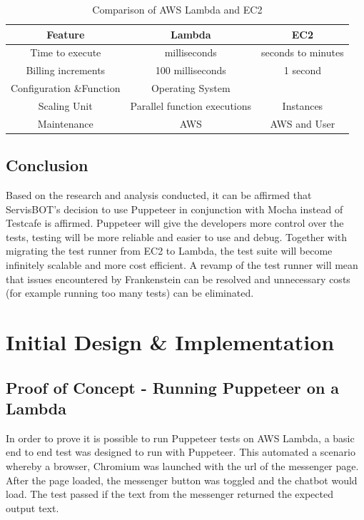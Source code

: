 \documentclass[12pt,a4paper,titlepage]{report}
\begin{document}
\begin{table}[ht]
  \centering
  \small
  \setlength\tabcolsep{6pt}
  \begin{tabular}{|c|c|c|}
   \hline
   \textbf{Feature} & \textbf{Lambda} & \textbf{EC2}\\
   \hline\hline
   Time to execute&milliseconds&seconds to minutes\\
   \hline
   Billing increments& 100 milliseconds&1 second\\
   \hline
   Configuration \&Function& Operating System\\
   \hline
   Scaling Unit&Parallel function executions&Instances\\
   \hline
   Maintenance& AWS&AWS and User\\
   \hline
  \end{tabular}
  \caption{Comparison of AWS Lambda and EC2 \autocite{inbook}}
 \end{table}

\section{Conclusion}
Based on the research and analysis conducted, it can be affirmed that ServisBOT's decision to use Puppeteer in conjunction 
with Mocha instead of Testcafe is affirmed. Puppeteer will give the developers more control over the tests, testing will be more reliable 
and easier to use and debug. Together with migrating the test runner from EC2 to Lambda, the test suite will become infinitely scalable and 
more cost efficient. A revamp of the test runner will mean that issues encountered by Frankenstein can be resolved and unnecessary costs (for 
example running too many tests) can be eliminated.

\chapter{Initial Design \& Implementation}

\section{Proof of Concept - Running Puppeteer on a Lambda}

In order to prove it is possible to run Puppeteer tests on AWS Lambda, a basic end to end test was designed
to run with Puppeteer. This automated a scenario whereby a browser, Chromium was launched with the url of the
messenger page. After the page loaded, the messenger button was toggled and the chatbot would load. The test
passed if the text from the messenger returned the expected output text.
\end{document}
